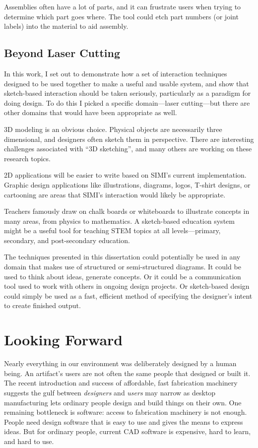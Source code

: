 Assemblies often have a lot of parts, and it can frustrate users when
trying to determine which part goes where. The tool could etch part
numbers (or joint labels) into the material to aid assembly.

\subsection{Beyond Laser Cutting}

In this work, I set out to demonstrate how a set of interaction
techniques designed to be used together to make a useful and usable
system, and show that sketch-based interaction should be taken
seriously, particularly as a paradigm for doing design. To do this I
picked a specific domain---laser cutting---but there are other domains
that would have been appropriate as well. 

3D modeling is an obvious choice. Physical objects are necessarily
three dimensional, and designers often sketch them in
perspective. There are interesting challenges associated with ``3D
sketching'', and many others are working on these research topics.

2D applications will be easier to write based on SIMI's current
implementation. Graphic design applications like illustrations,
diagrams, logos, T-shirt designs, or cartooning are areas that SIMI's
interaction would likely be appropriate.

Teachers famously draw on chalk boards or whiteboards to illustrate
concepts in many areas, from physics to mathematics. A sketch-based
education system might be a useful tool for teaching STEM topics at
all levels---primary, secondary, and post-secondary education.

The techniques presented in this dissertation could potentially be used
in any domain that makes use of structured or semi-structured
diagrams. It could be used to think about ideas, generate concepts. Or
it could be a communication tool used to work with others in ongoing
design projects. Or sketch-based design could simply be used as a
fast, efficient method of specifying the designer's intent to create
finished output.


\section{Looking Forward}

Nearly everything in our environment was deliberately designed by a
human being. An artifact's users are not often the same people that
designed or built it. The recent introduction and success of
affordable, fast fabrication machinery suggests the gulf between
\textit{designers} and \textit{users} may narrow as desktop
manufacturing lets ordinary people design and build things on their
own. One remaining bottleneck is software: access to fabrication
machinery is not enough. People need design software that is easy to
use and gives the means to express ideas. But for ordinary people,
current CAD software is expensive, hard to learn, and hard to use.

